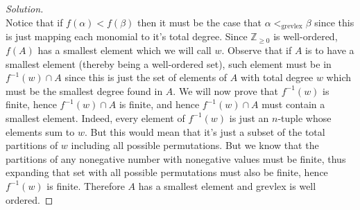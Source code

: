 \documentclass[]{article}
\newcommand\<{\langle}
\renewcommand\>{\rangle}
\newcommand{\ZZ}{\ensuremath{\mathbb{Z}}}
\newenvironment{solution}
{
	\begin{proof}[Solution] \text{ }
		\\
	}
	{
	\end{proof}
}
\begin{document}
\begin{solution}
$$	$$
	Notice that if $f(\alpha) < f(\beta)$ then it must be the case that $\alpha <_{\text{grevlex}} \beta$ since this is just mapping each monomial to it's total degree. Since $\ZZ_{\geq 0}$ is well-ordered, $f(A)$ has a smallest element which we will call $w$. Observe that if $A$ is to have a smallest element (thereby being a well-ordered set), such element must be in $f^{-1}(w) \cap A$ since this is just the set of elements of $A$ with total degree $w$ which must be the smallest degree found in $A$. We will now prove that $f^{-1}(w)$ is finite, hence $f^{-1}(w) \cap A$ is finite, and hence $f^{-1}(w) \cap A$ must contain a smallest element. Indeed, every element of $f^{-1}(w)$ is just an $n$-tuple whose elements sum to $w$. But this would mean that it's just a subset of the total partitions of $w$ including all possible permutations. But we know that the partitions of any nonegative number with nonegative values must be finite, thus expanding that set with all possible permutations must also be finite, hence $f^{-1}(w)$ is finite. Therefore $A$ has a smallest element and grevlex is well ordered. 
\end{solution}
\end{document}
